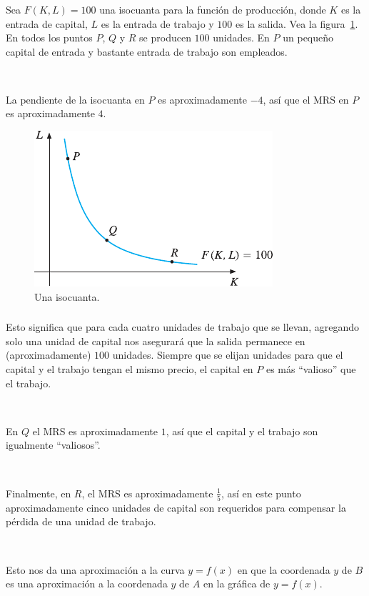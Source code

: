 \begin{frame}
\frametitle{\secname}
	\begin{minipage}{0.45\textwidth}
		\begin{example}
		Sea $F\left(K,L\right)=100$ una isocuanta para la función de producción, donde $K$ es la entrada de capital, $L$ es la entrada de trabajo y $100$ es la salida. Vea la figura~\ref{fig:isoquant}.
		En todos los puntos $P$, $Q$ y $R$ se producen $100$ unidades. En $P$ un pequeño capital de entrada y bastante entrada de trabajo son empleados.
		
		\
		
		La pendiente de la isocuanta en $P$ es aproximadamente $-4$, así que el \textsc{MRS} en $P$ es aproximadamente $4$.
		\end{example}
	\end{minipage}
	\begin{minipage}{0.45\textwidth}
		\begin{figure}[ht!]
			\centering
			\includegraphics[width=0.4\paperwidth]{isocuant}
			\caption{Una isocuanta.}\label{fig:isoquant}
		\end{figure}
	\end{minipage}
\end{frame}

\begin{frame}[t]
\frametitle{\secname}
Esto significa que para cada cuatro unidades de trabajo que se llevan, agregando solo una unidad de capital nos asegurará que la salida permanece en (aproximadamente) $100$ unidades. Siempre que se elijan unidades para que el capital y el trabajo tengan el mismo precio, el capital en $P$ es más ``valioso'' que el trabajo.

\

En $Q$ el \textsc{MRS} es aproximadamente $1$, así que el capital y el trabajo son igualmente ``valiosos''.

\

Finalmente, en $R$, el \textsc{MRS} es aproximadamente $\frac{1}{5}$, así en este punto aproximadamente cinco unidades de capital son requeridos para compensar la pérdida de una unidad de trabajo.

\

\begin{remark}
Esto nos da una aproximación a la curva $y=f\left(x\right)$ en que la coordenada $y$ de $B$ es una aproximación a la coordenada $y$ de $A$ en la gráfica de $y=f\left(x\right)$.
\end{remark}
\end{frame}

